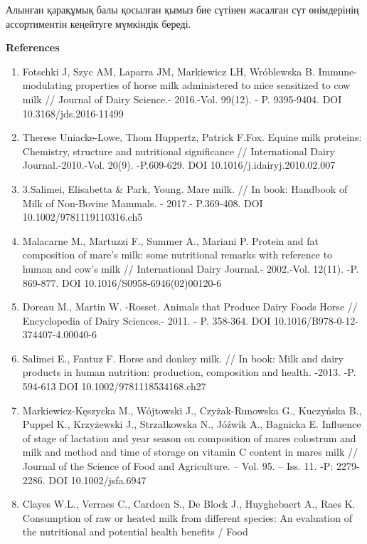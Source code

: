 Алынған қарақұмық балы қосылған қымыз бие сүтінен жасалған сүт
өнімдерінің ассортиментін кеңейтуге мүмкіндік береді.

{\bfseries References}

\begin{enumerate}
\def\labelenumi{\arabic{enumi}.}
\item
  Fotschki J, Szyc AM, Laparra JM, Markiewicz LH, Wróblewska B.
  Immune-modulating properties of horse milk administered to mice
  sensitized to cow milk // Journal of Dairy Science.- 2016.-Vol.
  99(12). - P. 9395-9404. DOI 10.3168/jds.2016-11499
\item
  Therese Uniacke-Lowe, Thom Huppertz, Patrick F.Fox. Equine milk
  proteins: Chemistry, structure and nutritional significance //
  International Dairy Journal.-2010.-Vol. 20(9). -P.609-629. DOI
  10.1016/j.idairyj.2010.02.007
\item
  3.Salimei, Elisabetta \& Park, Young. Mare milk. // In book: Handbook
  of Milk of Non-Bovine Mammals. - 2017.- P.369-408. DOI
  10.1002/9781119110316.ch5
\item
  Malacarne M., Martuzzi F., Summer A., Mariani P. Protein and fat
  composition of mare's milk: some nutritional remarks with reference to
  human and cow's milk // International Dairy Journal.- 2002.-Vol.
  12(11). -P. 869-877. DOI 10.1016/S0958-6946(02)00120-6
\item
  Doreau M., Martin W. -Rosset. Animals that Produce Dairy Foods
  \textbar{} Horse // Encyclopedia of Dairy Sciences.- 2011. - P.
  358-364. DOI 10.1016/B978-0-12-374407-4.00040-6
\item
  Salimei E., Fantuz F. Horse and donkey milk. // In book: Milk and
  dairy products in human nutrition: production, composition and health.
  -2013. -P. 594-613 DOI 10.1002/9781118534168.ch27
\item
  Markiewicz-Kęszycka M., Wójtowski J., Czyżak-Runowska G., Kuczyńska
  B., Puppel K., Krzyżewski J., Strzałkowska N., Jóźwik A., Bagnicka E.
  Influence of stage of lactation and year season on composition of
  mares\textquotesingle{} colostrum and milk and method and time of
  storage on vitamin C content in mares\textquotesingle{} milk //
  Journal of the Science of Food and Agriculture. -- Vol. 95. -- Iss.
  11. -P: 2279-2286. DOI 10.1002/jsfa.6947
\item
  Clayes W.L., Verraes C., Cardoen S., De Block J., Huyghebaert A., Raes
  K. Consumption of raw or heated milk from different species: An
  evaluation of the nutritional and potential health benefits / Food

\end{enumerate}
